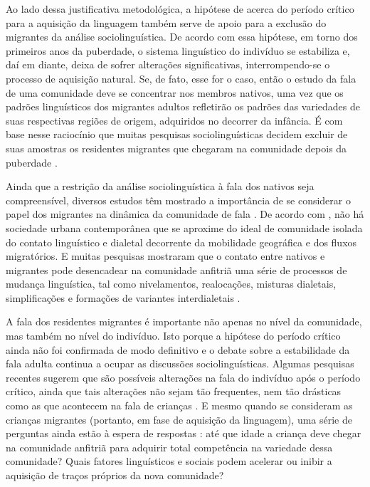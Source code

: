 \documentclass[
	a4paper,	%
	12pt,		%
	]{article}	%
\begin{document}
	Ao lado dessa justificativa metodológica, a hipótese de \citet{Lenneberg1967} acerca do período
	crítico para a aquisição da linguagem também serve de apoio para a exclusão do migrantes da
	análise sociolinguística. De acordo com essa hipótese, em torno dos primeiros anos da puberdade,
	o sistema linguístico do indivíduo se estabiliza e, daí em diante, deixa de sofrer alterações
	significativas, interrompendo-se o processo de aquisição natural. Se, de fato, esse for o caso,
	então o estudo da fala de uma comunidade deve se concentrar nos membros nativos, uma vez que os
	padrões linguísticos dos migrantes adultos refletirão os padrões das variedades de suas
	respectivas regiões de origem, adquiridos no decorrer da infância. É com base nesse raciocínio
	que muitas pesquisas sociolinguísticas decidem excluir de suas amostras os residentes migrantes
	que chegaram na comunidade depois da puberdade \citep[p. ex.][p.  111]{Labov1966}.

	Ainda que a restrição da análise sociolinguística à fala dos nativos seja compreensível,
	diversos estudos têm mostrado a importância de se considerar o papel dos migrantes na dinâmica
	da comunidade de fala \citep{Britain2018, Bortoni-Ricardo2011, Trudgill1986}. De acordo com
	\citet{Milroy2002}, não há sociedade urbana contemporânea que se aproxime do ideal de comunidade
	isolada do contato linguístico e dialetal decorrente da mobilidade geográfica e dos fluxos
	migratórios. E muitas pesquisas mostraram que o contato entre nativos e migrantes pode
	desencadear na comunidade anfitriã uma série de processos de mudança linguística, tal como
	nivelamentos, realocações, misturas dialetais, simplificações e formações de variantes
	interdialetais \citep{Trudgill1986}.

	A fala dos residentes migrantes é importante não apenas no nível da comunidade, mas também no
	nível do indivíduo. Isto porque a hipótese do período crítico \citep{Lenneberg1967} ainda não
	foi confirmada de modo definitivo e o debate sobre a estabilidade da fala adulta continua a
	ocupar as discussões sociolinguísticas. Algumas pesquisas recentes sugerem que são possíveis
	alterações na fala do indivíduo após o período crítico, ainda que tais alterações não sejam tão
	frequentes, nem tão drásticas como as que acontecem na fala de crianças
	\citep{Cukor-Avila.Bailey2013}. E mesmo quando se consideram as crianças migrantes (portanto, em
	fase de aquisição da linguagem), uma série de perguntas ainda estão à espera de respostas
	\citep{Oushiro2016, Nycz2015, Chambers1992, Trudgill1986}: até que idade a criança deve chegar
	na comunidade anfitriã para adquirir total competência na variedade dessa comunidade? Quais
	fatores linguísticos e sociais podem acelerar ou inibir a aquisição de traços próprios da nova
	comunidade?
\end{document}

